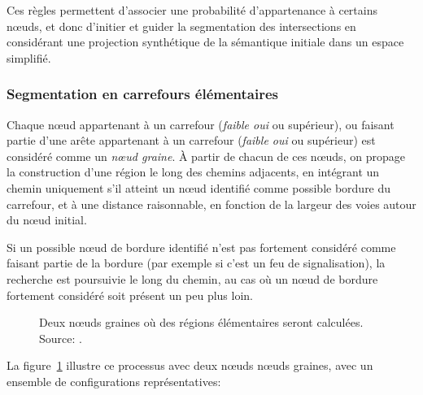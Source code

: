 \newpar{}

Ces règles permettent d'associer une probabilité d'appartenance à certains nœuds, et donc d'initier et guider la segmentation des intersections en considérant une projection synthétique de la sémantique initiale dans un espace simplifié.

\subsubsection{Segmentation en carrefours élémentaires}

Chaque nœud appartenant à un carrefour (\textit{faible oui} ou supérieur), ou faisant partie d'une arête appartenant à un carrefour (\textit{faible oui} ou supérieur) est considéré comme un \emph{nœud graine}. À partir de chacun de ces nœuds, on propage la construction d'une région le long des chemins adjacents, en intégrant un chemin uniquement s'il atteint un nœud identifié comme possible bordure du carrefour, et à une distance raisonnable, en fonction de la largeur des voies autour du nœud initial.

\newpar{}

Si un possible nœud de bordure identifié n'est pas fortement considéré comme faisant partie de la bordure (par exemple si c'est un feu de signalisation), la recherche est poursuivie le long du chemin, au cas où un nœud de bordure fortement considéré soit présent un peu plus loin.

\begin{figure}[ht]
    \centering
    \caption[Nœuds graines utilisés pour la segmentation de carrefour]{Deux nœuds graines où des régions élémentaires seront calculées. Source: \citep{Favreau2022}.}
    \label{fig:modelisation_boundarySelection}
\end{figure}

\newpar{}

La figure~\ref{fig:modelisation_boundarySelection} illustre ce processus avec deux nœuds nœuds graines, avec un ensemble de configurations représentatives: 

